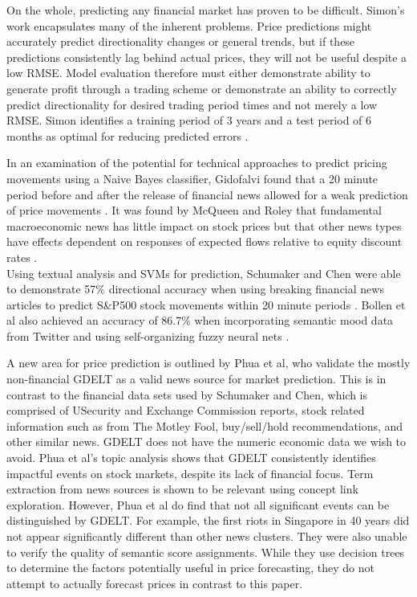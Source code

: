 On the whole, predicting any financial market has proven to be difficult. Simon's work encapsulates many of the inherent problems. Price predictions might accurately predict directionality changes or general trends, but if these predictions consistently lag behind actual prices, they will not be useful despite a low RMSE. Model evaluation therefore must either demonstrate ability to generate profit through a trading scheme or demonstrate an ability to correctly predict directionality for desired trading period times and not merely a low RMSE. Simon identifies a training period of 3 years and a test period of 6 months as optimal for reducing predicted errors \cite{forex_neuralnets}.

\noindent In an examination of the potential for technical approaches to predict pricing movements using a Naive Bayes classifier, Gidofalvi found that a 20 minute period before and after the release of financial news allowed for a weak prediction of price movements \cite{gidofalvi2001using}. It was found by McQueen and Roley that fundamental macroeconomic news has little impact on stock prices but that other news types have effects dependent on responses of expected flows relative to equity discount rates \cite{mcqueen1993stock}.\\

\noindent Using textual analysis and SVMs for prediction, Schumaker and Chen were able to demonstrate 57\% directional accuracy when using breaking financial news articles to predict S\&P500 stock movements within 20 minute periods \cite{schumaker2009textual}. Bollen et al also achieved an accuracy of 86.7\% when incorporating semantic mood data from Twitter and using self-organizing fuzzy neural nets \cite{bollen2011twitter}.

\noindent A new area for price prediction is outlined by Phua et al, who validate the mostly non-financial GDELT as a valid news source for market prediction. This is in contrast to the financial data sets used by Schumaker and Chen, which is comprised of USecurity and Exchange Commission reports, stock related information such as from The Motley Fool, buy/sell/hold recommendations, and other similar news. GDELT does not have the numeric economic data we wish to avoid. Phua et al's topic analysis shows that GDELT consistently identifies impactful events on stock markets, despite its lack of financial focus. Term extraction from news sources is shown to be relevant using concept link exploration. However, Phua et al do find that not all significant events can be distinguished by GDELT. For example, the first riots in Singapore in 40 years did not appear significantly different than other news clusters. They were also unable to verify the quality of semantic score assignments. While they use decision trees to determine the factors potentially useful in price forecasting, they do not attempt to actually forecast prices in contrast to this paper.
